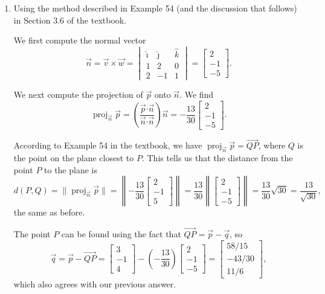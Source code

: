 \documentclass[letterpaper,12pt]{article}
\newcommand{\len}[1]{\lVert #1\rVert}
\newcommand{\dotp}{\boldsymbol{\cdot}}
\newcommand{\bbm}{\begin{bmatrix}}
\newcommand{\ebm}{\end{bmatrix}}
\DeclareMathOperator{\proj}{proj}
\begin{document}
\begin{enumerate}
\begin{enumerate}
\medskip

 \item Using the method described in Example 54 (and the discussion that follows) in Section 3.6 of the textbook.

\bigskip

We first compute the normal vector
\[
 \vec{n} = \vec{v}\times\vec{w} = \begin{vmatrix} \hat{\imath} & \hat{\jmath} & \hat{k}\\1&2&0\\2&-1&1\end{vmatrix} = \bbm 2\\-1\\-5\ebm.
\]

We next compute the projection of $\vec{p}$ onto $\vec{n}$. We find
\[
 \proj_{\vec{n}}\vec{p} = \left(\frac{\vec{p}\dotp\vec{n}}{\vec{n}\dotp\vec{n}}\right)\vec{n} = -\frac{13}{30}\bbm 2\\-1\\-5\ebm.
\]

According to Example 54 in the textbook, we have $\proj_{\vec{n}}\vec{p} = \overrightarrow{QP}$, where $Q$ is the point on the plane closest to $P$. This tells us that the distance from the point $P$ to the plane is
\[
 d(P,Q) = \len{\proj_{\vec{n}}\vec{p}} = \left\lVert-\frac{13}{30}\bbm 2\\-1\\5\ebm\right\rVert = \frac{13}{30}\left\lVert\bbm 2\\-1\\-5\ebm\right\rVert = \frac{13}{30}\sqrt{30} = \frac{13}{\sqrt{30}},
\]
the same as before.

The point $P$ can be found using the fact that $\overrightarrow{QP} = \vec{p}-\vec{q}$, so 
\[
 \vec{q} = \vec{p}-\overrightarrow{QP} = \bbm 3\\-1\\4\ebm - \left(-\frac{13}{30}\right)\bbm 2\\-1\\-5\ebm = \bbm 58/15\\-43/30\\11/6\ebm,
\]
which also agrees with our previous answer.
\end{enumerate}


\end{enumerate}
\end{document}
